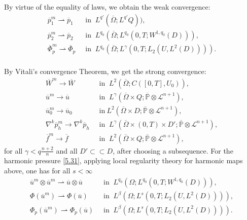 \documentclass[reqno]{amsart}
\theoremstyle{definition}
\theoremstyle{remark}
\numberwithin{equation}{section} \allowdisplaybreaks
\begin{document}
By virtue of the equality of laws, we obtain the weak convergence:
\begin{align*}\overline{p}_1^m\rightharpoonup \overline{p}_1 &~\mbox{ in }~ L^{q'}(\overline{\Omega};L^{q'}Q)),\\
\overline{p}_2^m\rightharpoonup \overline{p}_2&  ~\mbox{ in }~ L^{q_0}(\overline{\Omega};L^{q_0}(0,T;W^{1,q_0}(D))),\\
\overline{\Phi}_p^m\rightharpoonup \overline{\Phi}_p & ~\mbox{ in }~  L^{q_0}(\overline{\Omega};L^\gamma(0,T;L_2({U},L^2(D)))).\\
\end{align*}

By Vitali's convergence Theorem, we get the strong convergence:
\begin{align}\label{5.28}
\overline{W}^m\rightarrow \overline{W}&~\mbox{ in }~
L^2(\overline{\Omega};C([0,T],{U}_0)),\\
\label{5.29}
\overline{u}^m\rightarrow \overline{u} &~\mbox{ in }~ L^{\gamma}(\overline{\Omega}\times Q;\overline{\mathbb{P}}\otimes\mathcal{L}^{n+1}),\\
\label{5.30} \overline{u}_0^m\rightarrow \overline{u}_0 &~\mbox{ in
}~ L^{2}(\overline{\Omega}\times
D;\overline{\mathbb{P}}\otimes\mathcal{L}^{n+1}),\\
\label{5.31} \nabla^k\overline{p}_h^m\rightarrow
\nabla^k\overline{p}_h &~\mbox{ in }~
L^{\gamma}(\overline{\Omega}\times (0,T)\times
D';\overline{\mathbb{P}}\otimes\mathcal{L}^{n+1}),\\
\label{5.32} \overline{f}^m\rightarrow \overline{f} &~\mbox{ in }~
L^{2}(\overline{\Omega}\times
Q;\overline{\mathbb{P}}\otimes\mathcal{L}^{n+1}),
\end{align}
for all $\gamma<q\frac{n+2}{n}$ and all $D'\subset\subset D$, after
choosing a subsequence. For the harmonic pressure \eqref{5.31},
applying local regularity theory for harmonic maps above, one has for all $s<\infty$
\begin{align}\label{5.33}
\overline{u}^m\otimes\overline{u}^m\rightharpoonup
\overline{u}\otimes\overline{u} &~\mbox{ in }~  L^{q_0} (\Omega;L^{q_0}(0,T;W^{1,q_0}(D))),\\
\label{5.34} \Phi(\overline{u}^m)\rightharpoonup \Phi(\overline{u})
&~\mbox{ in }~
L^\beta (\Omega;L^{{s}}(0,T;L_2({U},L^2(D)))),\\
\label{5.35} \Phi_p(\overline{u}^m)\rightharpoonup
\Phi_p(\overline{u}) &~\mbox{ in }~  L^\beta
(\Omega;L^{{s}}(0,T;L_2({U},L^2(D)))).
\end{align}
\end{document}
